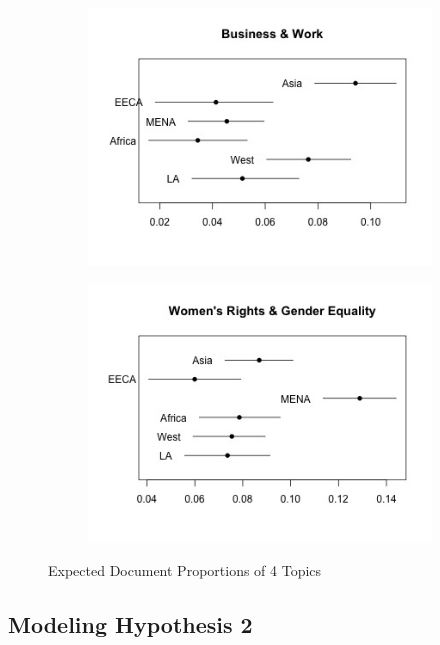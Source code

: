 \documentclass[11pt, oneside]{article}
\begin{document}
\begin{figure}
\begin{subfigure}{.5\textwidth}
  \label{fig:sfig2}
\end{subfigure}
\begin{subfigure}{.5\textwidth}
  \centering
  \includegraphics[width=1\linewidth]{4}
  \label{fig:sfig2}
\end{subfigure}
\begin{subfigure}{.5\textwidth}
  \centering
  \includegraphics[width=1\linewidth]{12}
  \label{fig:sfig2}
\end{subfigure}
\caption{Expected Document Proportions of 4 Topics}
\label{fig:4topics}
\end{figure}

\subsection{Modeling Hypothesis 2}
\end{document}

